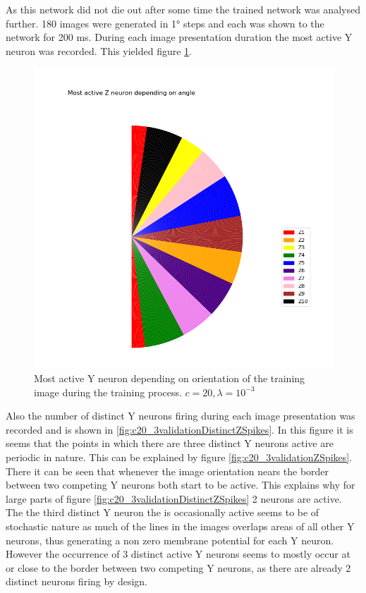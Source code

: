 As this network did not die out after some time the trained network was analysed further. 180 images were generated in 1° steps and each was shown to the network for 200 ms. During each image presentation duration the most active Y neuron was recorded. This yielded figure \ref{fig:c20_3Pie}.

\begin{figure}
  \includegraphics[width=\linewidth]{figures/angleNetwork/c20_3validationPie.png}
  \caption{Most active Y neuron depending on orientation of the training image during the training process. $c = 20, \lambda = 10^{-3}$}
  \label{fig:c20_3Pie}
\end{figure}

Also the number of distinct Y neurons firing during each image presentation was recorded and is shown in \ref{fig:c20_3validationDistinctZSpikes}. In this figure it is seems that the points in which there are three distinct Y neurons active are periodic in nature. This can be explained by figure \ref{fig:c20_3validationZSpikes}. There it can be seen that whenever the image orientation nears the border between two competing Y neurons both start to be active. This explains why for large parts of figure \ref{fig:c20_3validationDistinctZSpikes} 2 neurons are active. The the third distinct Y neuron the is occasionally active seems to be of stochastic nature as much of the lines in the images overlaps areas of all other Y neurons, thus generating a non zero membrane potential for each Y neuron. However the occurrence of 3 distinct active Y neurons seems to mostly occur at or close to the border between two competing Y neurons, as there are already 2 distinct neurons firing by design.

